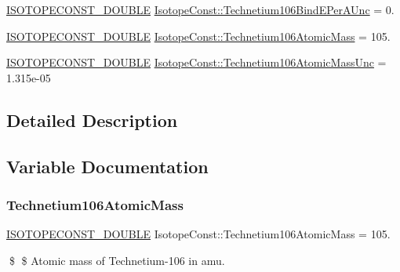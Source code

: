 \begin{DoxyCompactItemize}
\item 
\mbox{\hyperlink{group___isotope_const-_macros_ga8f45a7272ce02c0b4c65c44636ed719a}{I\+S\+O\+T\+O\+P\+E\+C\+O\+N\+S\+T\+\_\+\+D\+O\+U\+B\+LE}} \mbox{\hyperlink{group___isotope_const-_technetium-_tc106_ga856c18b8483749c77d33f93fc500c5e2}{Isotope\+Const\+::\+Technetium106\+Bind\+E\+Per\+A\+Unc}} = 0.
\item 
\mbox{\hyperlink{group___isotope_const-_macros_ga8f45a7272ce02c0b4c65c44636ed719a}{I\+S\+O\+T\+O\+P\+E\+C\+O\+N\+S\+T\+\_\+\+D\+O\+U\+B\+LE}} \mbox{\hyperlink{group___isotope_const-_technetium-_tc106_ga60d699cbee1cc686c1f03e89d670066c}{Isotope\+Const\+::\+Technetium106\+Atomic\+Mass}} = 105.
\item 
\mbox{\hyperlink{group___isotope_const-_macros_ga8f45a7272ce02c0b4c65c44636ed719a}{I\+S\+O\+T\+O\+P\+E\+C\+O\+N\+S\+T\+\_\+\+D\+O\+U\+B\+LE}} \mbox{\hyperlink{group___isotope_const-_technetium-_tc106_ga9693f2fc886b418d847e9168b6f921c8}{Isotope\+Const\+::\+Technetium106\+Atomic\+Mass\+Unc}} = 1.\+315e-\/05
\end{DoxyCompactItemize}


\subsection{Detailed Description}


\subsection{Variable Documentation}
\mbox{\label{group___isotope_const-_technetium-_tc106_ga60d699cbee1cc686c1f03e89d670066c}} 
\subsubsection{\texorpdfstring{Technetium106\+Atomic\+Mass}{Technetium106AtomicMass}}
{\footnotesize\ttfamily \mbox{\hyperlink{group___isotope_const-_macros_ga8f45a7272ce02c0b4c65c44636ed719a}{I\+S\+O\+T\+O\+P\+E\+C\+O\+N\+S\+T\+\_\+\+D\+O\+U\+B\+LE}} Isotope\+Const\+::\+Technetium106\+Atomic\+Mass = 105.}

\$ \$ Atomic mass of Technetium-\/106 in amu. \mbox{\label{group___isotope_const-_technetium-_tc106_ga9693f2fc886b418d847e9168b6f921c8}} 
